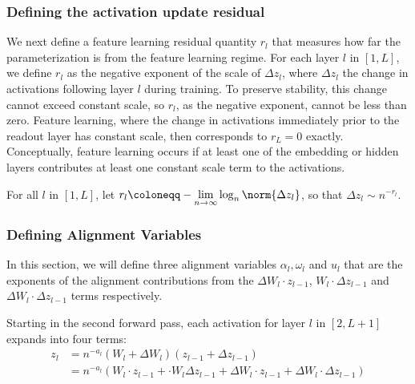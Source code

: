 \subsubsection{Defining the activation update residual}
We next define a feature learning residual quantity $r_l$ that measures how far the parameterization is from the feature learning regime. For each layer $l$ in $[1, L]$, we define $r_l$ as the negative exponent of the scale of $\Delta z_l$, where $\Delta z_l$ the change in activations following layer $l$ during training. To preserve stability, this change cannot exceed constant scale, so $r_l$, as the negative exponent, cannot be less than zero. Feature learning, where the change in activations immediately prior to the readout layer has constant scale, then corresponds to $r_L = 0$ exactly. Conceptually, feature learning occurs if at least one of the embedding or hidden layers contributes at least one constant scale term to the activations.

\begin{appendixdef}
For all $l$ in $[1, L]$, let $\displaystyle r_l \coloneqq - \lim_{n \rightarrow \infty} \log_n \norm{\Delta z_l}$, so that $\Delta z_l \sim n^{-r_l}$.
\end{appendixdef}


\subsubsection{Defining Alignment Variables}
\label{app:theory_align_vars}

In this section, we will define three alignment variables $\alpha_l, \omega_l$ and $u_l$ that are the exponents of the alignment contributions from the $\Delta W_l \cdot z_{l-1} $, $W_l \cdot \Delta z_{l-1}$ and $ \Delta W_l \cdot \Delta z_{l-1}$ terms respectively.

Starting in the second forward pass, each activation for layer $l$ in $[2,L+1]$ expands into four terms:
\begin{align*}
    z_l &= n^{-a_l}(W_l + \Delta W_l)(z_{l-1} + \Delta z_{l-1})\\
    &= n^{-a_l}( W_l \cdot z_{l-1} +  \cdot W_l \Delta z_{l-1}  + \Delta W_l \cdot z_{l-1}  + \Delta W_l \cdot \Delta z_{l-1})
\end{align*}

